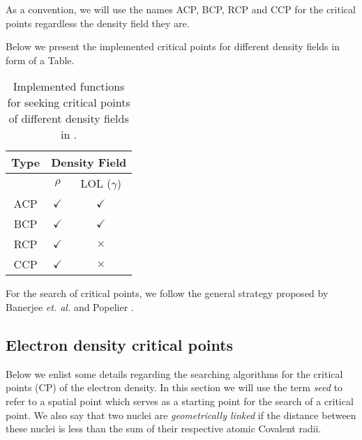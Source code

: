 As a convention, we will use the names ACP, BCP, RCP and CCP for the critical points regardless the density field they are.

Below we present the implemented critical points for different density fields in form of a Table.
%
\begin{table}[hb!]
\begin{center}
\begin{tabular}{||c|c|c||}
\hline
\hline
\textbf{Type} & \multicolumn{2}{|c||}{\textbf{Density Field}} \\
\hline
\hline
 & $\rho$ & LOL ($\gamma$) \\
\hline
ACP & $\checkmark$ & $\checkmark$ \\\hline
BCP & $\checkmark$ & $\checkmark$ \\\hline
RCP & $\checkmark$ & $\boldsymbol{\times}$ \\\hline
CCP & $\checkmark$ & $\boldsymbol{\times}$ \\\hline
\hline
\end{tabular}
\caption{Implemented functions for seeking critical points of different density fields in \DTK{} \dtkversion.}\label{tab:implemseeks}
\end{center}
\end{table}

For the search of critical points, we follow the general strategy proposed by Banerjee \textit{et. al.} \cite{bib:banerjee1985} and Popelier \cite{bib:popelier1994}.

\subsection{Electron density critical points}

Below we enlist some details regarding the searching algorithms for the critical points (CP)
of the electron density. In this section we will use the term \textit{seed} to refer to a
spatial point which serves as a starting point for the search of a critical point. We also
say that two nuclei are \textit{geometrically linked} if the distance between these nuclei
is less than the sum of their respective atomic Covalent radii.

